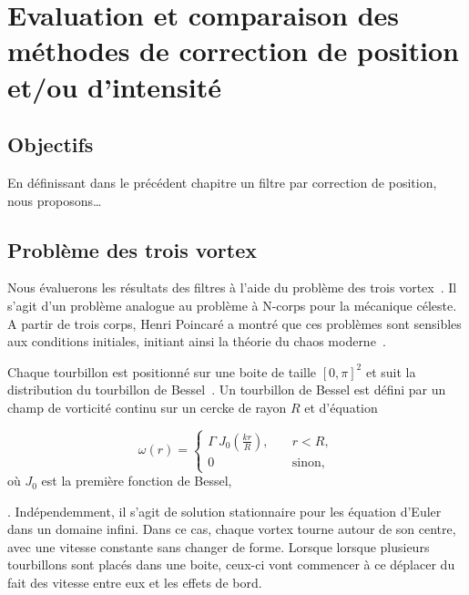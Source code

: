 
\chapter{Evaluation et comparaison des méthodes de correction de position et/ou d'intensité}

\section{Objectifs}

En définissant dans le précédent chapitre un filtre par correction de position, nous proposons\dots

\section{Problème des trois vortex}

Nous évaluerons les résultats des filtres à l'aide du problème des trois vortex~\cite{aref_motion_1979,yim_motion_2022}. Il s'agit d'un problème analogue au problème à N-corps pour la mécanique céleste. A partir de trois corps, Henri Poincaré a montré que ces problèmes sont sensibles aux conditions initiales, initiant ainsi la théorie du chaos moderne~\cite{poincare1890,diacu1996}.

Chaque tourbillon est positionné sur une boite de taille $[0, \pi]^2$  et suit la distribution du tourbillon de Bessel~\cite{vanGeffen1996}. Un tourbillon de Bessel est défini par un champ de vorticité continu sur un cercke de rayon $R$ et d'équation

\begin{equation*}
    \omega(r) =  \begin{cases}
        \Gamma ~ J_0\left(\frac{k  r}{ R}\right),   \quad & r < R,        \\
        0 \quad                                           & \text{sinon},
    \end{cases}
\end{equation*}où $J_0$ est la première fonction de Bessel,

. Indépendemment, il s'agit de solution stationnaire pour les équation d'Euler dans un domaine infini. Dans ce cas, chaque vortex tourne autour de son centre, avec une vitesse constante sans changer de forme. Lorsque lorsque plusieurs tourbillons sont placés dans une boite, ceux-ci vont commencer à ce déplacer du fait des vitesse entre eux et les effets de bord.
